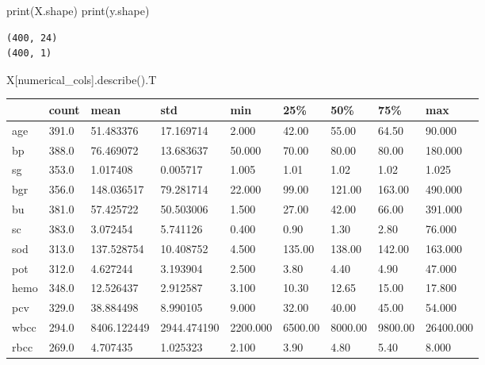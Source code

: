 \documentclass[
  11pt,
  letterpaper,
  DIV=11,
  numbers=noendperiod]{scrartcl}
\newenvironment{Shaded}{\begin{snugshade}}{\end{snugshade}}
\newcommand{\BuiltInTok}[1]{\textcolor[rgb]{0.00,0.23,0.31}{#1}}
\newcommand{\NormalTok}[1]{\textcolor[rgb]{0.00,0.23,0.31}{#1}}
\begin{document}
\begin{Shaded}
\begin{Highlighting}[]
\BuiltInTok{print}\NormalTok{(X.shape)}
\BuiltInTok{print}\NormalTok{(y.shape)}

\end{Highlighting}
\end{Shaded}

\begin{verbatim}
(400, 24)
(400, 1)
\end{verbatim}

\begin{Shaded}
\begin{Highlighting}[]
\NormalTok{X[numerical\_cols].describe().T}
\end{Highlighting}
\end{Shaded}

\begin{longtable}[]{@{}lllllllll@{}}
\toprule\noalign{}
& count & mean & std & min & 25\% & 50\% & 75\% & max \\
\midrule\noalign{}
\endhead
\bottomrule\noalign{}
\endlastfoot
age & 391.0 & 51.483376 & 17.169714 & 2.000 & 42.00 & 55.00 & 64.50 &
90.000 \\
bp & 388.0 & 76.469072 & 13.683637 & 50.000 & 70.00 & 80.00 & 80.00 &
180.000 \\
sg & 353.0 & 1.017408 & 0.005717 & 1.005 & 1.01 & 1.02 & 1.02 & 1.025 \\
bgr & 356.0 & 148.036517 & 79.281714 & 22.000 & 99.00 & 121.00 & 163.00
& 490.000 \\
bu & 381.0 & 57.425722 & 50.503006 & 1.500 & 27.00 & 42.00 & 66.00 &
391.000 \\
sc & 383.0 & 3.072454 & 5.741126 & 0.400 & 0.90 & 1.30 & 2.80 &
76.000 \\
sod & 313.0 & 137.528754 & 10.408752 & 4.500 & 135.00 & 138.00 & 142.00
& 163.000 \\
pot & 312.0 & 4.627244 & 3.193904 & 2.500 & 3.80 & 4.40 & 4.90 &
47.000 \\
hemo & 348.0 & 12.526437 & 2.912587 & 3.100 & 10.30 & 12.65 & 15.00 &
17.800 \\
pcv & 329.0 & 38.884498 & 8.990105 & 9.000 & 32.00 & 40.00 & 45.00 &
54.000 \\
wbcc & 294.0 & 8406.122449 & 2944.474190 & 2200.000 & 6500.00 & 8000.00
& 9800.00 & 26400.000 \\
rbcc & 269.0 & 4.707435 & 1.025323 & 2.100 & 3.90 & 4.80 & 5.40 &
8.000 \\
\end{longtable}
\end{document}
